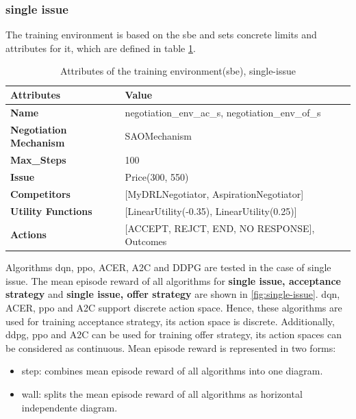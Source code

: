 \subsubsection{single issue}
The training environment is based on the \gls{sbe} and sets concrete limits and attributes for it, which are defined in table \ref{tab:attributes-sbe}.

\begin{table}[htbp]
\centering
\begin{tabular}{l l l} \toprule
\bfseries \textbf{Attributes}      & \bfseries \textbf{Value}             \\ \midrule
\textbf{Name}                    & negotiation\_env\_ac\_s, negotiation\_env\_of\_s \\
\textbf{Negotiation Mechanism}   & SAOMechanism                                        \\
\textbf{Max\_Steps}              & 100                                                 \\
\textbf{Issue}             	     & Price(300, 550)                                     \\
\textbf{Competitors}             & [MyDRLNegotiator, AspirationNegotiator]             \\
\textbf{Utility Functions}       & [LinearUtility(-0.35), LinearUtility(0.25)]         \\
\textbf{Actions}                 & [ACCEPT, REJCT, END, NO RESPONSE], Outcomes\\
\bottomrule
\end{tabular}
\caption{Attributes of the training environment(sbe), single-issue}
\label{tab:attributes-sbe}
\end{table}

Algorithms \gls{dqn}, \gls{ppo}, ACER\parencite{DBLP:journals/corr/WangBHMMKF16}, A2C and DDPG are tested in the case of single issue. The mean episode reward of all algorithms for \textbf{single issue, acceptance strategy} and \textbf{single issue, offer strategy} are shown in \ref{fig:single-issue}. \gls{dqn}, ACER, \gls{ppo} and A2C support discrete action space. Hence, these algorithms are used for training acceptance strategy, its action space is discrete. Additionally, \gls{ddpg}, \gls{ppo} and A2C can be used for training offer strategy, its action spaces can be considered as continuous. Mean episode reward is represented in two forms: 
\begin{itemize}
\item step: combines mean episode reward of all algorithms into one diagram.
\item wall: splits the mean episode reward of all algorithms as horizontal independente diagram.
\end{itemize}

